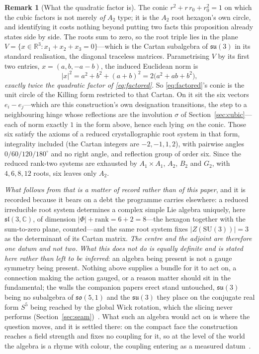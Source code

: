 \documentclass[11pt,a4paper]{article}
\theoremstyle{definition}
\newtheorem{remark}[theorem]{Remark}
\begin{document}
\begin{remark}[What the quadratic factor is]\label{rem:killing}
The conic $r^{2}+r\,r_{0}+r_{0}^{2}=1$ on which the cubic factors is not merely \emph{of} $A_{2}$ type; it is
the $A_{2}$ root hexagon's own circle, and identifying it costs nothing beyond putting two facts this
proposition already states side by side. The roots sum to zero, so the root
triple lies in the plane $V=\{x\in\mathbb{R}^{3}:x_{1}+x_{2}+x_{3}=0\}$---which is the Cartan subalgebra of
$\mathfrak{su}(3)$ in its standard realisation, the diagonal traceless matrices. Parametrising $V$ by its first
two entries, $x=(a,b,-a-b)$, the induced Euclidean norm is
\[
  |x|^{2}=a^{2}+b^{2}+(a+b)^{2}=2\bigl(a^{2}+ab+b^{2}\bigr),
\]
\emph{exactly twice the quadratic factor of \eqref{eq:factored}}. So \eqref{eq:factored}'s conic is the unit
circle of the Killing form restricted to that Cartan. On it sit the six vectors $e_{i}-e_{j}$---which are this
construction's own designation transitions, the step to a neighbouring hinge whose reflections are the
involution $\sigma$ of Section~\ref{sec:cubic}---each of norm exactly $1$ in the form above, hence each lying
\emph{on} the conic. Those six satisfy the axioms of a reduced crystallographic root system in that form,
integrality included (the Cartan integers are $-2,-1,1,2$), with pairwise angles $0/60/120/180^{\circ}$ and no
right angle, and reflection group of order six. Since the reduced rank-two systems are exhausted by
$A_{1}\times A_{1}$, $A_{2}$, $B_{2}$ and $G_{2}$, with $4,6,8,12$ roots, six leaves only $A_{2}$.

\emph{What follows from that is a matter of record rather than of this paper}, and it is recorded because it
bears on a debt the programme carries elsewhere: a reduced irreducible root system determines a complex simple
Lie algebra uniquely, here $\mathfrak{sl}(3,\mathbb{C})$, of dimension $|\Phi|+\mathrm{rank}=6+2=8$---the
hexagon together with the sum-to-zero plane, counted---and the same root system fixes $|Z(\mathrm{SU}(3))|=3$ as
the determinant of its Cartan matrix. \emph{The centre and the adjoint are therefore one datum and not two.}
\emph{What this does not do is equally definite and is stated here rather than left to be inferred}: an algebra
being present is not a gauge symmetry being present. Nothing above supplies a bundle for it to act on, a
connection making the action gauged, or a reason matter should sit in the fundamental; the walls the companion
papers erect stand untouched, $\mathfrak{su}(3)$ being no subalgebra of $\mathfrak{so}(5,1)$ and the
$\mathfrak{su}(3)$ they place on the conjugate real form $S^{5}$ being reached by the global Wick rotation,
which the slicing never performs (Section~\ref{sec:seam})~\cite{JanzenBoundary,JanzenGeometricCore}. What such an algebra would act on is where the question moves, and it is settled there: on the compact face the construction reaches a field strength and fixes no coupling for it, so at the level of the world the algebra is a rhyme with colour, the coupling entering as a measured datum~\cite{JanzenBoundary}.
\end{remark}
\end{document}
